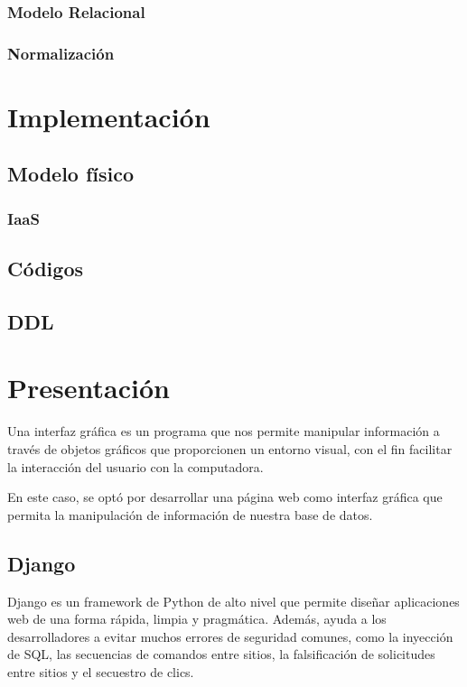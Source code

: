 \documentclass[12pt,letterpaper]{article}
\begin{document}
			\subsubsection{Modelo Relacional}
			
			\subsubsection{Normalización}
		
	\section{Implementación}
		\subsection{Modelo físico}
		
			\subsubsection{IaaS}
	
		\subsection{Códigos}
		
		\subsection{DDL}
	
	\section{Presentación}
		Una interfaz gráfica es un programa que nos permite manipular información a través de objetos gráficos que proporcionen un entorno visual, con el fin facilitar la interacción del usuario con la computadora.\par
		En este caso, se optó por desarrollar una página web como interfaz gráfica que permita la manipulación de información de nuestra base de datos.
		
		\subsection{Django}
		Django es un framework de Python de alto nivel que permite diseñar aplicaciones web de una forma rápida, limpia y pragmática. Además, ayuda a los desarrolladores a evitar muchos errores de seguridad comunes, como la inyección de SQL, las secuencias de comandos entre sitios, la falsificación de solicitudes entre sitios y el secuestro de clics.
			
\end{document}
